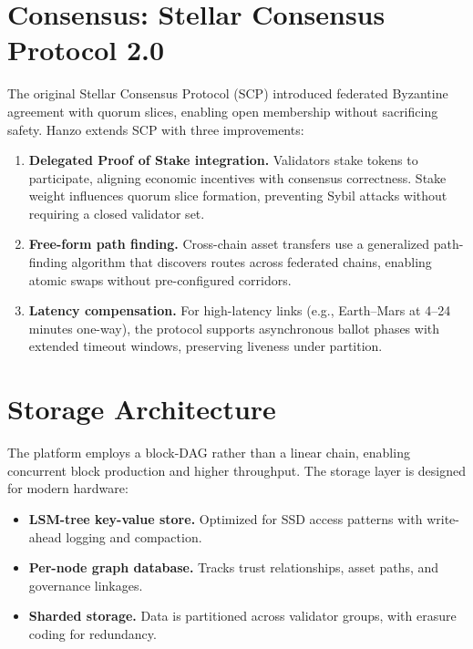 \documentclass[11pt,twocolumn]{article}
\begin{document}
\section{Consensus: Stellar Consensus Protocol 2.0}
\label{sec:consensus}

The original Stellar Consensus Protocol (SCP) introduced federated Byzantine
agreement with quorum slices, enabling open membership without sacrificing
safety. Hanzo extends SCP with three improvements:

\begin{enumerate}[leftmargin=1.1em]
    \item \textbf{Delegated Proof of Stake integration.} Validators stake tokens
    to participate, aligning economic incentives with consensus correctness. Stake
    weight influences quorum slice formation, preventing Sybil attacks without
    requiring a closed validator set.
    \item \textbf{Free-form path finding.} Cross-chain asset transfers use a
    generalized path-finding algorithm that discovers routes across federated
    chains, enabling atomic swaps without pre-configured corridors.
    \item \textbf{Latency compensation.} For high-latency links (e.g., Earth--Mars
    at 4--24 minutes one-way), the protocol supports asynchronous ballot phases
    with extended timeout windows, preserving liveness under partition.
\end{enumerate}

\section{Storage Architecture}
\label{sec:storage}

The platform employs a block-DAG rather than a linear chain, enabling concurrent
block production and higher throughput. The storage layer is designed for modern
hardware:

\begin{itemize}[leftmargin=1.1em]
    \item \textbf{LSM-tree key-value store.} Optimized for SSD access patterns
    with write-ahead logging and compaction.
    \item \textbf{Per-node graph database.} Tracks trust relationships, asset
    paths, and governance linkages.
    \item \textbf{Sharded storage.} Data is partitioned across validator groups,
    with erasure coding for redundancy.
\end{itemize}
\end{document}
